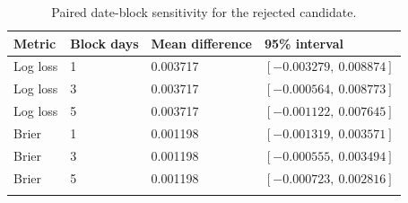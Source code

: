\begin{table}[htbp]\centering
{\fontsize{10}{12}\selectfont\renewcommand{\arraystretch}{1.18}\setlength{\tabcolsep}{4pt}
\begin{tabularx}{\linewidth}{@{}L{30mm}C{24mm}C{42mm}X@{}}\toprule{}
\textbf{Metric} & \textbf{Block days} & \textbf{Mean difference} & \textbf{95\% interval} \\ \midrule
Log loss & 1 & 0.003717 & $[-0.003279,\ 0.008874]$ \\ \hline
Log loss & 3 & 0.003717 & $[-0.000564,\ 0.008773]$ \\ \hline
Log loss & 5 & 0.003717 & $[-0.001122,\ 0.007645]$ \\ \hline
Brier & 1 & 0.001198 & $[-0.001319,\ 0.003571]$ \\ \hline
Brier & 3 & 0.001198 & $[-0.000555,\ 0.003494]$ \\ \hline
Brier & 5 & 0.001198 & $[-0.000723,\ 0.002816]$ \\ \hline
{}\bottomrule\end{tabularx}}
\caption[Paired date-block sensitivity for the rejected candidate]{Paired date-block sensitivity for the rejected candidate.}\label{tab:intervals}
\end{table}
